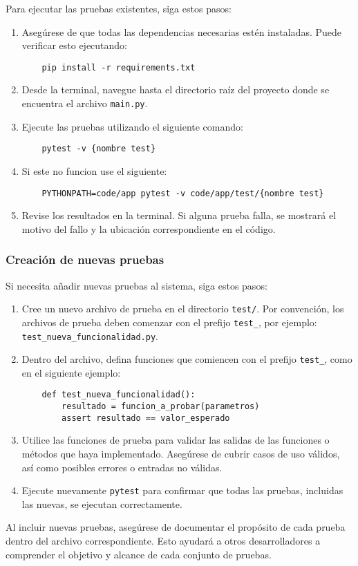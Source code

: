 Para ejecutar las pruebas existentes, siga estos pasos:
\begin{enumerate}
    \item Asegúrese de que todas las dependencias necesarias estén instaladas. Puede verificar esto ejecutando:
    \begin{verbatim}
    pip install -r requirements.txt
    \end{verbatim}
    \item Desde la terminal, navegue hasta el directorio raíz del proyecto donde se encuentra el archivo \texttt{main.py}.
    \item Ejecute las pruebas utilizando el siguiente comando:
    \begin{verbatim}
    pytest -v {nombre test}
    \end{verbatim}
    \item Si este no funcion use el siguiente: 
    \begin{verbatim}
    PYTHONPATH=code/app pytest -v code/app/test/{nombre test}
    \end{verbatim}
    \item Revise los resultados en la terminal. Si alguna prueba falla, se mostrará el motivo del fallo y la ubicación correspondiente en el código.
\end{enumerate}

\subsubsection{Creación de nuevas pruebas}

Si necesita añadir nuevas pruebas al sistema, siga estos pasos:
\begin{enumerate}
    \item Cree un nuevo archivo de prueba en el directorio \texttt{test/}. Por convención, los archivos de prueba deben comenzar con el prefijo \texttt{test\_}, por ejemplo: \texttt{test\_nueva\_funcionalidad.py}.
    \item Dentro del archivo, defina funciones que comiencen con el prefijo \texttt{test\_}, como en el siguiente ejemplo:
    \begin{verbatim}
    def test_nueva_funcionalidad():
        resultado = funcion_a_probar(parametros)
        assert resultado == valor_esperado
    \end{verbatim}
    \item Utilice las funciones de prueba para validar las salidas de las funciones o métodos que haya implementado. Asegúrese de cubrir casos de uso válidos, así como posibles errores o entradas no válidas.
    \item Ejecute nuevamente \texttt{pytest} para confirmar que todas las pruebas, incluidas las nuevas, se ejecutan correctamente.
\end{enumerate}

Al incluir nuevas pruebas, asegúrese de documentar el propósito de cada prueba dentro del archivo correspondiente. Esto ayudará a otros desarrolladores a comprender el objetivo y alcance de cada conjunto de pruebas.



